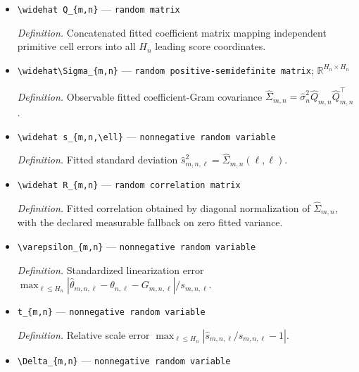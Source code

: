 \documentclass{article}
\begin{document}
\begin{itemize}
  \par\smallskip\noindent\emph{Definition.} Pooled residual estimator of \(\sigma_n^2\).
  \item \texttt{\textbackslash{}\allowbreak{}widehat Q\_\allowbreak{}\{m,\allowbreak{}n\}\allowbreak{}} --- \texttt{random matrix}
  \par\smallskip\noindent\emph{Definition.} Concatenated fitted coefficient matrix mapping independent primitive cell errors into all \(H_n\) leading score coordinates.
  \item \texttt{\textbackslash{}\allowbreak{}widehat\textbackslash{}\allowbreak{}Sigma\_\allowbreak{}\{m,\allowbreak{}n\}\allowbreak{}} --- \texttt{random positive-\allowbreak{}semidefinite matrix}; \(\mathbb R^{H_n\times H_n}\)
  \par\smallskip\noindent\emph{Definition.} Observable fitted coefficient-Gram covariance \(\widehat\Sigma_{m,n}=\widehat\sigma_n^2\widehat Q_{m,n}\widehat Q_{m,n}^{\top}\).
  \item \texttt{\textbackslash{}\allowbreak{}widehat s\_\allowbreak{}\{m,\allowbreak{}n,\allowbreak{}\textbackslash{}\allowbreak{}ell\}\allowbreak{}} --- \texttt{nonnegative random variable}
  \par\smallskip\noindent\emph{Definition.} Fitted standard deviation \(\widehat s_{m,n,\ell}^2=\widehat\Sigma_{m,n}(\ell,\ell)\).
  \item \texttt{\textbackslash{}\allowbreak{}widehat R\_\allowbreak{}\{m,\allowbreak{}n\}\allowbreak{}} --- \texttt{random correlation matrix}
  \par\smallskip\noindent\emph{Definition.} Fitted correlation obtained by diagonal normalization of \(\widehat\Sigma_{m,n}\), with the declared measurable fallback on zero fitted variance.
  \item \texttt{\textbackslash{}\allowbreak{}varepsilon\_\allowbreak{}\{m,\allowbreak{}n\}\allowbreak{}} --- \texttt{nonnegative random variable}
  \par\smallskip\noindent\emph{Definition.} Standardized linearization error \(\max_{\ell\le H_n}|\widehat\theta_{m,n,\ell}-\theta_{n,\ell}-G_{m,n,\ell}|/s_{m,n,\ell}\).
  \item \texttt{t\_\allowbreak{}\{m,\allowbreak{}n\}\allowbreak{}} --- \texttt{nonnegative random variable}
  \par\smallskip\noindent\emph{Definition.} Relative scale error \(\max_{\ell\le H_n}|\widehat s_{m,n,\ell}/s_{m,n,\ell}-1|\).
  \item \texttt{\textbackslash{}\allowbreak{}Delta\_\allowbreak{}\{m,\allowbreak{}n\}\allowbreak{}} --- \texttt{nonnegative random variable}

\end{itemize}
\end{document}
